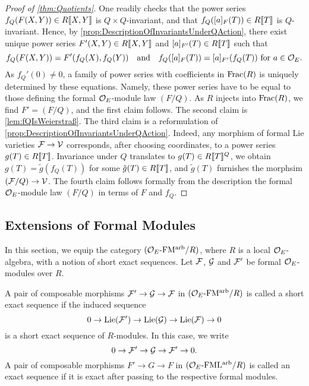 \documentclass[../main.tex]{subfiles}
\begin{document}
\begin{proof}[Proof of \cref{thm:Quotients}]
  One readily checks that the power series 
  $f_Q(F(X,Y)) \in R\llbracket X,Y \rrbracket$ is $Q\times Q$-invariant, and that 
  $f_Q([a]_F(T)) \in R\llbracket T \rrbracket$ is $Q$-invariant. Hence, 
  by \cref{prop:DescriptionOfInvariantsUnderQAction}, there exist unique power
  series
  $F'(X,Y) \in R\llbracket X,Y \rrbracket$ and $[a]_{F'}(T) \in R\llbracket T \rrbracket$ such that 
  \begin{equation*}
    f_Q(F(X,Y)) = F'(f_Q(X),f_Q(Y)) \quad \text{and} \quad 
    f_Q([a]_F(T)) = [a]_{F'}(f_Q(T)) \text{ for }a\in \mathcal{O}_E.
  \end{equation*}
  As $f_Q'(0) \neq 0$, a family of power series with coefficients in $\mathrm{Frac}(R)$
  is uniquely determined by these equations. Namely, these power series have
  to be equal to those defining the formal $\mathcal{O}_E$-module law $(F/Q)$. As $R$
  injects into $\mathrm{Frac}(R)$, we find $F' = (F/Q)$, and the first claim follows.
  The second claim is \cref{lem:fQIsWeierstraß}.
  The third claim is a reformulation of
  \cref{prop:DescriptionOfInvariantsUnderQAction}. Indeed, any morphism of formal
  Lie varieties $\mathcal{F} \to \mathcal{V}$ corresponds, after choosing coordinates, to a 
  power series $g(T) \in R\llbracket T \rrbracket$. Invariance under $Q$ translates to 
  $g(T) \in R\llbracket T \rrbracket^Q$, we obtain $g(T) = \tilde g (f_Q(T))$ for
  some $\tilde g(T) \in R\llbracket T \rrbracket$, and 
  $\tilde g(T)$ furnishes the morphsim $(\mathcal{F}/Q)\to \mathcal{V}$. The
  fourth claim follows formally from the description the formal 
  $\mathcal{O}_E$-module law $(F/Q)$ in terms of $F$ and $f_Q$.
\end{proof}


\subsection{Extensions of Formal Modules} %
\label{sub:Extensions of Formal Modules}
In this section, we equip the category ${({\mathcal{O}_E}\textnormal-\allowbreak\mathrm{FM^{arb}}/{R})}$, where $R$ is a
local $\mathcal{O}_E$-algebra, with a notion of short exact sequences. 
Let $\mathcal{F}$, $\mathcal{G}$ and $\mathcal{F}'$ be formal $\mathcal{O}_E$-modules over $R$. 

\begin{defi}\label{def:SESofFormalModules}
  A pair of composable morphisms $\mathcal{F}' \to \mathcal{G} \to \mathcal{F}$ in 
  ${({\mathcal{O}_E}\textnormal-\allowbreak\mathrm{FM^{arb}}/{R})}$ is called 
  a short exact sequence if the induced sequence 
  \begin{equation*}
    0 \to \operatorname{Lie}(\mathcal{F}') \to \operatorname{Lie}(\mathcal{G}) \to \operatorname{Lie}(\mathcal{F}) \to 0
  \end{equation*}
  is a short exact sequence of $R$-modules. In this case, we write
  \begin{equation*}
    0 \to \mathcal{F}' \to \mathcal{G} \to \mathcal{F}' \to 0.
  \end{equation*}
  A pair of composable morphisms $F' \to G \to F$ in ${({\mathcal{O}_E}\textnormal-\allowbreak\mathrm{FML^{arb}}/{R})}$
  is called an exact sequence if it is exact after passing to 
  the respective formal modules. 
\end{defi}
\end{document}
